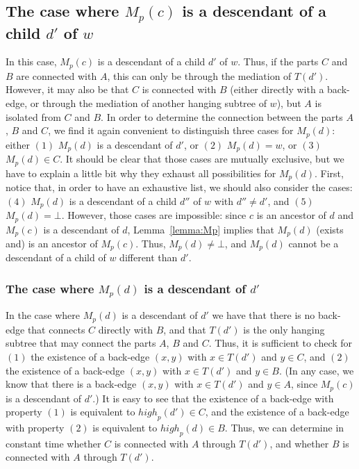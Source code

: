 \documentclass[11pt,a4paper]{article}
\begin{document}
\subsection{The case where $M_p(c)$ is a descendant of a child $d'$ of $w$}
\label{section:Mp(c)Descw}
In this case, $M_p(c)$ is a descendant of a child $d'$ of $w$. Thus, if the parts $C$ and $B$ are connected with $A$, this can only be through the mediation of $T(d')$. However, it may also be that $C$ is connected with $B$ (either directly with a back-edge, or through the mediation of another hanging subtree of $w$), but $A$ is isolated from $C$ and $B$. In order to determine the connection between the parts $A$, $B$ and $C$, we find it again convenient to distinguish three cases for $M_p(d)$: either $(1)$ $M_p(d)$ is a descendant of $d'$, or $(2)$ $M_p(d)=w$, or $(3)$ $M_p(d)\in C$. It should be clear that those cases are mutually exclusive, but we have to explain a little bit why they exhaust all possibilities for $M_p(d)$. First, notice that, in order to have an exhaustive list, we should also consider the cases: $(4)$ $M_p(d)$ is a descendant of a child $d''$ of $w$ with $d''\neq d'$, and $(5)$ $M_p(d)=\bot$. However, those cases are impossible: since $c$ is an ancestor of $d$ and $M_p(c)$ is a descendant of $d$, Lemma~\ref{lemma:Mp} implies that $M_p(d)$ (exists and) is an ancestor of $M_p(c)$. Thus, $M_p(d)\neq\bot$, and $M_p(d)$ cannot be a descendant of a child of $w$ different than $d'$.

\subsubsection{The case where $M_p(d)$ is a descendant of $d'$}
In the case where $M_p(d)$ is a descendant of $d'$ we have that there is no back-edge that connects $C$ directly with $B$, and that $T(d')$ is the only hanging subtree that may connect the parts $A$, $B$ and $C$. Thus, it is sufficient to check for $(1)$ the existence of a back-edge $(x,y)$ with $x\in T(d')$ and $y\in C$, and $(2)$ the existence of a back-edge $(x,y)$ with $x\in T(d')$ and $y\in B$. (In any case, we know that there is a back-edge $(x,y)$ with $x\in T(d')$ and $y\in A$, since $M_p(c)$ is a descendant of $d'$.) It is easy to see that the existence of a back-edge with property $(1)$ is equivalent to $\mathit{high}_p(d')\in C$, and the existence of a back-edge with property $(2)$ is equivalent to $\mathit{high}_p(d)\in B$. Thus, we can determine in constant time whether $C$ is connected with $A$ through $T(d')$, and whether $B$ is connected with $A$ through $T(d')$. 
\end{document}
